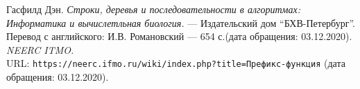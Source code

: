 
\begin{thebibliography}{99}
Гасфилд Дэн.
{\itshape Строки, деревья и последовательности в алгоритмах: Информатика  и вычислетльная биология.} --- Издательский дом \enquote{БХВ-Петербург}. Перевод с английского: И.В. Романовский --- 654 с.(дата обращения: 03.12.2020).
{\itshape NEERC ITMO.} \\URL: \texttt{https://neerc.ifmo.ru/wiki/index.php?title=Префикс-функция} (дата обращения: 03.12.2020).
\end{thebibliography}
\pagebreak